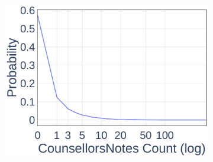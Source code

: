 \begin{figure}[ht]
\begin{subfigure}[b]{0.3\textwidth}
    \includegraphics[width=\textwidth]{Figures/Data-CounsellorsNotes-PDF}
  \end{subfigure}
	\vspace*{1em}


\end{figure}
